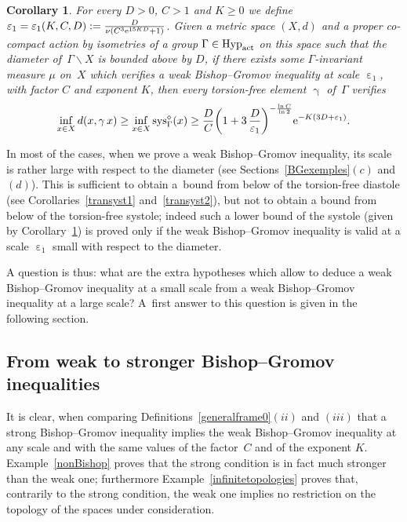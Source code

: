 \documentclass[10pt,a4paper]{amsart}
\numberwithin{equation}{section}
\newtheorem{Corollary}[theor]{Corollary}
\newcommand{\sys}{\operatorname{sys}}
\newcommand{\g}{\operatorname{\gamma}}
\newcommand{\e}{\operatorname{\varepsilon}}
\begin{document}
\begin{Corollary}\label{minorsystole1}
For every $D >0$, $C > 1 $ and $K\ge 0$ we define $\e_1 = \e_1 (K, C, D) := \frac{D}{\nu \left(C^3 {\rm e}^{15 K D} + 1\right)}$. Given a metric space $(X,d)$ and a proper co-compact action by isometries of a group $\Gamma \in \text{\rm Hyp}_{\rm act}$
on this space such that the diameter of~$\Gamma \backslash X$ is bounded above by $D$, if there exists some $\Gamma$-invariant measure $\mu$ on~$X$ which verifies a weak Bishop--Gromov inequality at scale $\e_1$, with factor $C$ and exponent $K$, then every torsion-free element $\g$ of~$\Gamma$ verifies
\begin{gather*}
\inf_{x \in X} d(x, \g x) \ge \inf_{x \in X} \sys^{\diamond}_\Gamma (x)
\ge \frac{D}{C} \bigg(1 + 3\, \frac{D}{\e_1}\bigg)^{- \frac{\ln C}{\ln 2}} {\rm e}^{- K (3 D + \e_1)}.
\end{gather*}
\end{Corollary}

In most of the cases, when we prove a weak Bishop--Gromov inequality, its scale is rather large with respect to the diameter (see Sections~\ref{BGexemples}$(c)$ and $(d)$). This is sufficient to obtain a~bound from below of the torsion-free diastole (see Corollaries~\ref{transyst1} and~\ref{transyst2}), but not to obtain a bound from below of the torsion-free systole; indeed such a lower bound of the systole (given by Corollary~\ref{minorsystole1}) is proved only
if the weak Bishop--Gromov inequality is valid at a scale $\e_1$ small with respect to the diameter.


A question is thus: what are the extra hypotheses which allow to deduce a
weak Bishop--Gromov inequality at a small scale from a weak Bishop--Gromov inequality
at a large scale? A~first answer to this question is given in the following section.

\subsection{From weak to stronger Bishop--Gromov inequalities}\label{weakvsstrongBishop}

It is clear, when comparing Definitions~\ref{generalframe0}$(ii)$ and $(iii)$ that a strong Bishop--Gromov inequality implies the weak Bishop--Gromov inequality at
any scale and with the same values of the factor~$C$ and of the exponent $K$. Example~\ref{nonBishop} proves that the strong condition is in fact much
stronger than the weak one; furthermore Example~\ref{infinitetopologies} proves that, contrarily to the strong condition, the weak one implies no restriction
on the topology of the spaces under consideration.
\end{document}

